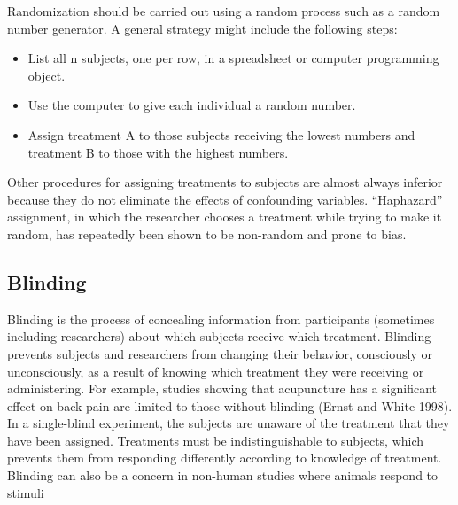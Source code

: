 \documentclass[]{book}
\providecommand{\tightlist}{%
  \setlength{\itemsep}{0pt}\setlength{\parskip}{0pt}}
\begin{document}
Randomization should be carried out using a random process such as a random number generator. A general strategy might include the following steps:

\begin{itemize}
\tightlist
\item
  List all n subjects, one per row, in a spreadsheet or computer programming object.
\item
  Use the computer to give each individual a random number.
\item
  Assign treatment A to those subjects receiving the lowest numbers and treatment B to those with the highest numbers.
\end{itemize}

Other procedures for assigning treatments to subjects are almost always inferior because they do not eliminate the effects of confounding variables. ``Haphazard'' assignment, in which the researcher chooses a treatment while trying to make it random, has repeatedly been shown to be non-random and prone to bias.

\hypertarget{blinding}{%
\subsection{Blinding}\label{blinding}}

Blinding is the process of concealing information from participants (sometimes including researchers) about which subjects receive which treatment. Blinding prevents subjects and researchers from changing their behavior, consciously or unconsciously, as a result of knowing which treatment they were receiving or administering. For example, studies showing that acupuncture has a significant effect on back pain are limited to those without blinding (Ernst and White 1998). In a single-blind experiment, the subjects are unaware of the treatment that they have been assigned. Treatments must be indistinguishable to subjects, which prevents them from responding differently according to knowledge of treatment. Blinding can also be a concern in non-human studies where animals respond to stimuli
\end{document}
